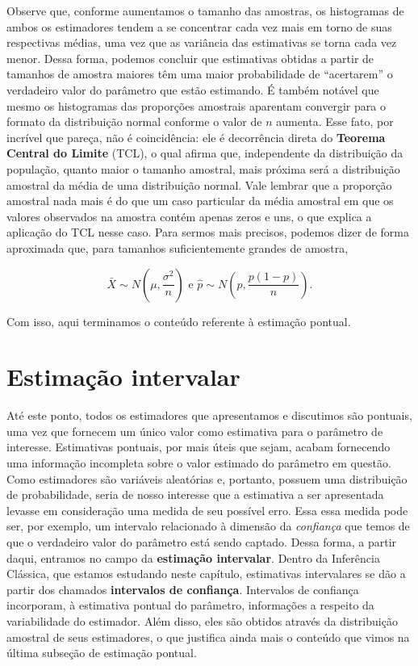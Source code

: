 \documentclass[
  letterpaper,
  DIV=11,
  numbers=noendperiod]{scrreprt}
\begin{document}
Observe que, conforme aumentamos o tamanho das amostras, os histogramas
de ambos os estimadores tendem a se concentrar cada vez mais em torno de
suas respectivas médias, uma vez que as variância das estimativas se
torna cada vez menor. Dessa forma, podemos concluir que estimativas
obtidas a partir de tamanhos de amostra maiores têm uma maior
probabilidade de ``acertarem'' o verdadeiro valor do parâmetro que estão
estimando. É também notável que mesmo os histogramas das proporções
amostrais aparentam convergir para o formato da distribuição normal
conforme o valor de \(n\) aumenta. Esse fato, por incrível que pareça,
não é coincidência: ele é decorrência direta do \textbf{Teorema Central
do Limite} (TCL), o qual afirma que, independente da distribuição da
população, quanto maior o tamanho amostral, mais próxima será a
distribuição amostral da média de uma distribuição normal. Vale lembrar
que a proporção amostral nada mais é do que um caso particular da média
amostral em que os valores observados na amostra contém apenas zeros e
uns, o que explica a aplicação do TCL nesse caso. Para sermos mais
precisos, podemos dizer de forma aproximada que, para tamanhos
suficientemente grandes de amostra,

\[
\bar{X} \sim N\left(\mu, \frac{\sigma^2}{n} \right) \text{ e } \hat{p}\sim N\left(p, \frac{p(1-p)}{n} \right).
\]

Com isso, aqui terminamos o conteúdo referente à estimação pontual.

\hypertarget{estimauxe7uxe3o-intervalar}{%
\section{Estimação intervalar}\label{estimauxe7uxe3o-intervalar}}

Até este ponto, todos os estimadores que apresentamos e discutimos são
pontuais, uma vez que fornecem um único valor como estimativa para o
parâmetro de interesse. Estimativas pontuais, por mais úteis que sejam,
acabam fornecendo uma informação incompleta sobre o valor estimado do
parâmetro em questão. Como estimadores são variáveis aleatórias e,
portanto, possuem uma distribuição de probabilidade, seria de nosso
interesse que a estimativa a ser apresentada levasse em consideração uma
medida de seu possível erro. Essa essa medida pode ser, por exemplo, um
intervalo relacionado à dimensão da \emph{confiança} que temos de que o
verdadeiro valor do parâmetro está sendo captado. Dessa forma, a partir
daqui, entramos no campo da \textbf{estimação intervalar}. Dentro da
Inferência Clássica, que estamos estudando neste capítulo, estimativas
intervalares se dão a partir dos chamados \textbf{intervalos de
confiança}. Intervalos de confiança incorporam, à estimativa pontual do
parâmetro, informações a respeito da variabilidade do estimador. Além
disso, eles são obtidos através da distribuição amostral de seus
estimadores, o que justifica ainda mais o conteúdo que vimos na última
subseção de estimação pontual.
\end{document}
